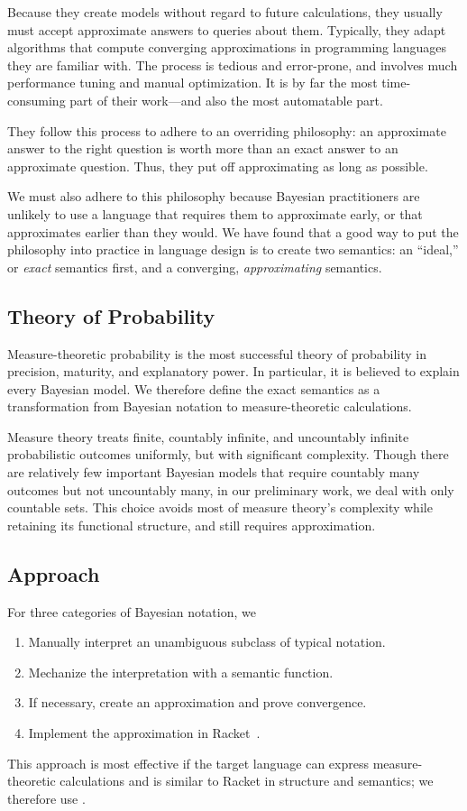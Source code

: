 Because they create models without regard to future calculations, they usually must accept approximate answers to queries about them. Typically, they adapt algorithms that compute converging approximations in programming languages they are familiar with. The process is tedious and error-prone, and involves much performance tuning and manual optimization. It is by far the most time-consuming part of their work---and also the most automatable part.

They follow this process to adhere to an overriding philosophy: an approximate answer to the right question is worth more than an exact answer to an approximate question. Thus, they put off approximating  as long as possible.

We must also adhere to this philosophy because Bayesian practitioners are unlikely to use a language that requires them to approximate early, or that approximates earlier than they would. We have found that a good way to put the philosophy into practice in language design is to create two semantics: an ``ideal,'' or \textit{exact} semantics first, and a converging, \textit{approximating} semantics.

\subsection{Theory of Probability}

Measure-theoretic probability is the most successful theory of probability in precision, maturity, and explanatory power. In particular, it is believed to explain every Bayesian model. We therefore define the exact semantics as a transformation from Bayesian notation to measure-theoretic calculations.

Measure theory treats finite, countably infinite, and uncountably infinite probabilistic outcomes uniformly, but with significant complexity. Though there are relatively few important Bayesian models that require countably many outcomes but not uncountably many, in our preliminary work, we deal with only countable sets. This choice avoids most of measure theory's complexity while retaining its functional structure, and still requires approximation.

\subsection{Approach}

For three categories of Bayesian notation, we
\begin{enumerate}
	\item Manually interpret an unambiguous subclass of typical notation.
	\item Mechanize the interpretation with a semantic function.
	\item If necessary, create an approximation and prove convergence.
	\item Implement the approximation in Racket~\cite{cit:racket-lang}.
\end{enumerate}
This approach is most effective if the target language can express measure-theoretic calculations and is similar to Racket in structure and semantics; we therefore use \targetlang.

